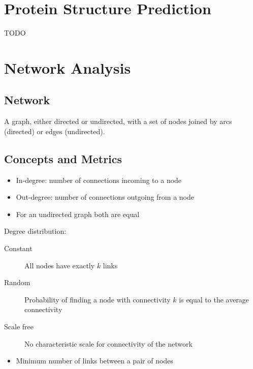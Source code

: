 \documentclass[a4paper]{article}
\begin{document}
\section{Protein Structure Prediction}

TODO

\section{Network Analysis}

\subsection{Network}

A graph, either directed or undirected, with a set of nodes joined by arcs
(directed) or edges (undirected).

\subsection{Concepts and Metrics}


\begin{itemize}
  \item
    In-degree: number of connections incoming to a node

  \item
    Out-degree: number of connections outgoing from a node

  \item
    For an undirected graph both are equal
\end{itemize}

Degree distribution:

\begin{description}
  \item[Constant]
    All nodes have exactly $k$ links

  \item[Random]
    Probability of finding a node with connectivity $k$ is equal to the average
    connectivity

  \item[Scale free]
    No characteristic scale for connectivity of the network
\end{description}


\begin{itemize}
  \item
    Minimum number of links between a pair of nodes
\end{itemize}
\end{document}
